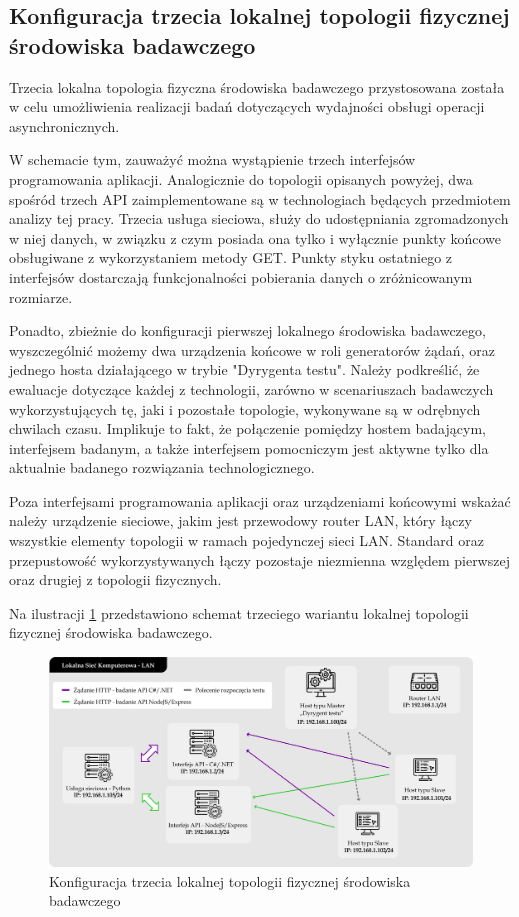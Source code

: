\subsection*{Konfiguracja trzecia lokalnej topologii fizycznej środowiska badawczego}
\label{sec:lokalne-srodowisko-badawcze-ver-3}
Trzecia lokalna topologia fizyczna środowiska badawczego przystosowana została w celu umożliwienia realizacji badań dotyczących wydajności obsługi operacji asynchronicznych.

W schemacie tym, zauważyć można wystąpienie trzech interfejsów programowania aplikacji. Analogicznie do topologii opisanych powyżej, dwa spośród trzech API zaimplementowane są w technologiach będących przedmiotem analizy tej pracy. Trzecia usługa sieciowa, służy do udostępniania zgromadzonych w niej danych, w związku z czym posiada ona tylko i wyłącznie punkty końcowe obsługiwane z wykorzystaniem metody GET. Punkty styku ostatniego z interfejsów dostarczają funkcjonalności pobierania danych o zróżnicowanym rozmiarze.

Ponadto, zbieżnie do konfiguracji pierwszej lokalnego środowiska badawczego, wyszczególnić możemy dwa urządzenia końcowe w roli generatorów żądań, oraz jednego hosta działającego w trybie "Dyrygenta testu". Należy podkreślić, że ewaluacje dotyczące każdej z technologii, zarówno w scenariuszach badawczych wykorzystujących tę, jaki i pozostałe topologie, wykonywane są w odrębnych chwilach czasu. Implikuje to fakt, że połączenie pomiędzy hostem badającym, interfejsem badanym, a także interfejsem pomocniczym jest aktywne tylko dla aktualnie badanego rozwiązania technologicznego.

Poza interfejsami programowania aplikacji oraz urządzeniami końcowymi wskażać należy urządzenie sieciowe, jakim jest przewodowy router LAN, który łączy wszystkie elementy topologii w ramach pojedynczej sieci LAN. Standard oraz przepustowość wykorzystywanych łączy pozostaje niezmienna względem pierwszej oraz drugiej z topologii fizycznych.

Na ilustracji \ref{fig:topologia-3} przedstawiono schemat trzeciego wariantu lokalnej topologii fizycznej środowiska badawczego.

\begin{figure}[ht]
    \centering
     \includegraphics[width=\linewidth]{rys04/topologia-3.png}
    \caption{Konfiguracja trzecia lokalnej topologii fizycznej środowiska badawczego}
    \label{fig:topologia-3}
\end{figure}

